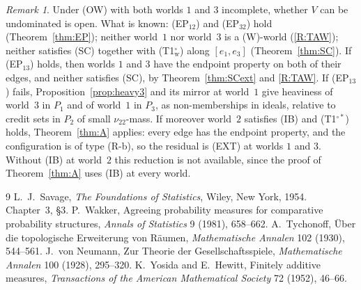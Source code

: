 \documentclass[11pt]{article}
\theoremstyle{definition}\newtheorem{definition}[theorem]{Definition}
\theoremstyle{remark}\newtheorem{remark}[theorem]{Remark}
\newcommand{\Tw}{\textup{(T1$^\circ_{\mathrm w}$)}}
\newcommand{\Tos}{\textup{(T1$^{\circ*}$)}}
\begin{document}
\begin{remark}\label{rem:OWgeneral}
Under (OW) with both worlds $1$ and $3$ incomplete, whether $V$ can be
undominated is open. What is known: (EP$_{12}$) and (EP$_{32}$) hold
(Theorem~\ref{thm:EP}); neither world~$1$ nor world~$3$ is a (W)-world
(\ref{R:TAW}); neither satisfies (SC) together with \Tw{} along $[e_1,e_3]$
(Theorem~\ref{thm:SC}). If (EP$_{13}$) holds, then worlds $1$ and $3$ have
the endpoint property on both of their edges, and neither satisfies (SC),
by Theorem~\ref{thm:SCext} and \ref{R:TAW}. If (EP$_{13}$) fails,
Proposition~\ref{prop:heavy3} and its mirror at world~$1$ give heaviness of
world~$3$ in $P_1$ and of world~$1$ in $P_3$, as non-memberships in ideals,
relative to credit sets in $P_2$ of small $\nu_{22}$-mass. If moreover
world~$2$ satisfies (IB) and \Tos{} holds, Theorem~\ref{thm:A} applies:
every edge has the endpoint property, and the configuration is of type
(R-b), so the residual is (EXT) at worlds $1$ and $3$. Without (IB) at
world~$2$ this reduction is not available, since the proof of
Theorem~\ref{thm:A} uses (IB) at every world.
\end{remark}

\begin{thebibliography}{9}
 L.~J.~Savage, \emph{The Foundations of Statistics}, Wiley,
New York, 1954. Chapter~3, \S3.
 P.~Wakker, Agreeing probability measures for comparative
probability structures, \emph{Annals of Statistics} 9 (1981), 658--662.
 A.~Tychonoff, \"Uber die topologische Erweiterung von
R\"aumen, \emph{Mathematische Annalen} 102 (1930), 544--561.
 J.~von Neumann, Zur Theorie der Gesellschaftsspiele,
\emph{Mathematische Annalen} 100 (1928), 295--320.
 K.~Yosida and E.~Hewitt, Finitely additive measures,
\emph{Transactions of the American Mathematical Society} 72 (1952), 46--66.
\end{thebibliography}
\end{document}
